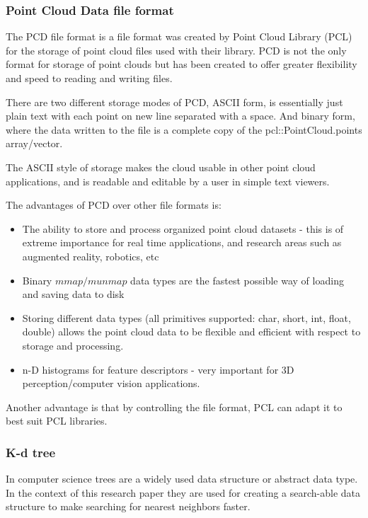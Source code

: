 	
		\subsubsection{Point Cloud Data file format}
			The PCD file format is a file format was created by Point Cloud Library (PCL) for the storage of point cloud files used with their library. PCD is not the only format for storage of point clouds but has been created to offer greater flexibility and speed to reading and writing files.
			
			There are two different storage modes of PCD, ASCII form, is essentially just plain text with each point on new line separated with a space. And binary form, where the data written to the file is a complete copy of the pcl::PointCloud.points array/vector.
			
			The ASCII style of storage makes the cloud usable in other point cloud applications, and is readable and editable by a user in simple text viewers.
			
			The advantages of PCD over other file formats is:
			\begin{itemize}
				\item  The ability to store and process organized point cloud datasets - this is of extreme importance for real time applications, and research areas such as augmented reality, robotics, etc
				
				\item Binary $mmap/munmap$ data types are the fastest possible way of loading and saving data to disk
				
				\item Storing different data types (all primitives supported: char, short, int, float, double) allows the point cloud data to be flexible and efficient with respect to storage and processing.
				
				\item n-D histograms for feature descriptors - very important for 3D perception/computer vision applications.
			\end{itemize}
			
			Another advantage is that by controlling the file format, PCL can adapt it to best suit PCL libraries. \citep{point_cloud_library_pcd_2010}
		
		\subsubsection{K-d tree}
			In computer science trees are a widely used data structure or abstract data type. In the context of this research paper they are used for creating a search-able data structure to make searching for nearest neighbors faster.
			
